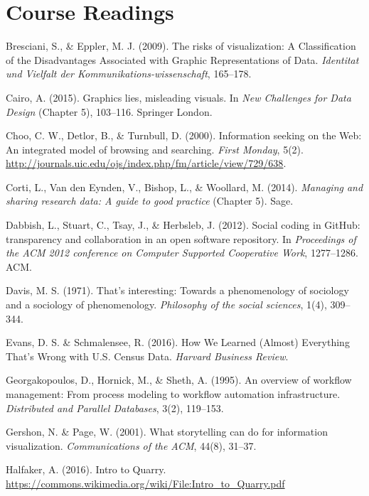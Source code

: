 \documentclass[11pt]{article}
\begin{document}
\section{Course Readings}

\begin{description}
\item Bresciani, S., \& Eppler, M. J. (2009). The risks of visualization: A Classification of the Disadvantages Associated with Graphic Representations of Data. \textit{Identitat und Vielfalt der Kommunikations-wissenschaft}, 165--178.
\item Cairo, A. (2015). Graphics lies, misleading visuals. In \textit{New Challenges for Data Design} (Chapter 5), 103--116. Springer London.
\item Choo, C. W., Detlor, B., \& Turnbull, D. (2000). Information seeking on the Web: An integrated model of browsing and searching. \textit{First Monday}, 5(2). \url{http://journals.uic.edu/ojs/index.php/fm/article/view/729/638}.
\item Corti, L., Van den Eynden, V., Bishop, L., \& Woollard, M. (2014). \textit{Managing and sharing research data: A guide to good practice} (Chapter 5). Sage.
\item Dabbish, L., Stuart, C., Tsay, J., \& Herbsleb, J. (2012). Social coding in GitHub: transparency and collaboration in an open software repository. In \textit{Proceedings of the ACM 2012 conference on Computer Supported Cooperative Work}, 1277--1286. ACM.
\item Davis, M. S. (1971). That's interesting: Towards a phenomenology of sociology and a sociology of phenomenology. \textit{Philosophy of the social sciences}, 1(4), 309--344.
\item Evans, D. S. \& Schmalensee, R. (2016). How We Learned (Almost) Everything That's Wrong with U.S. Census Data. \textit{Harvard Business Review}.
\item Georgakopoulos, D., Hornick, M., \& Sheth, A. (1995). An overview of workflow management: From process modeling to workflow automation infrastructure. \textit{Distributed and Parallel Databases}, 3(2), 119--153.
\item Gershon, N. \& Page, W. (2001). What storytelling can do for information visualization. \textit{Communications of the ACM}, 44(8), 31--37.
\item Halfaker, A. (2016). Intro to Quarry. \url{https://commons.wikimedia.org/wiki/File:Intro_to_Quarry.pdf}

\end{description}
\end{document}
